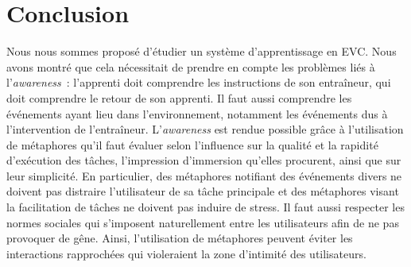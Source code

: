 \documentclass[11pt]{article}
\begin{document}
\begin{comment}
For the first type of actions, The same metaphors than for the collaboration tasks can be used. For the second type, four metaphors can be evaluated:
\begin{enumerate}
	\item The coach avatar casts a spell using a specific gesture and voice control. Such a multimodal command can be real, i.e the coach has to perform it in order to make a parameter change, or just a metaphor, i.e the coach doesn't perform it but his avatar moves and speaks automatically.
	\item A 3D animation is performed by the system. For example, a grey cloud can appear and move through the scene in order to indicate that the weather is now rainy.
	\item A popup indicating the change is displayed.
	\item No indication at all.
\end{enumerate}

Several perception aspects can be evaluated thanks to these tests: the annoyance and pleasant degrees and the execution time (some metaphors can capture the attention of the trainee for a quite long time).
\end{comment}

\section{Conclusion}

Nous nous sommes proposé d'étudier un système d'apprentissage en EVC. Nous avons montré que cela nécessitait de prendre en compte les problèmes liés à l'\textit{awareness}~: l'apprenti doit comprendre les instructions de son entraîneur, qui doit comprendre le retour de son apprenti. Il faut aussi comprendre les événements ayant lieu dans l'environnement, notamment les événements dus à l'intervention de l'entraîneur. L'\textit{awareness} est rendue possible grâce à l'utilisation de métaphores qu'il faut évaluer selon l'influence sur la qualité et la rapidité d'exécution des tâches, l'impression d'immersion qu'elles procurent, ainsi que sur leur simplicité. En particulier, des métaphores notifiant des événements divers ne doivent pas distraire l'utilisateur de sa tâche principale et des métaphores visant la facilitation de tâches ne doivent pas induire de stress. Il faut aussi respecter les normes sociales qui s'imposent naturellement entre les utilisateurs afin de ne pas provoquer de gêne. Ainsi, l'utilisation de métaphores peuvent éviter les interactions rapprochées qui violeraient la zone d'intimité des utilisateurs.
\\
\end{document}
